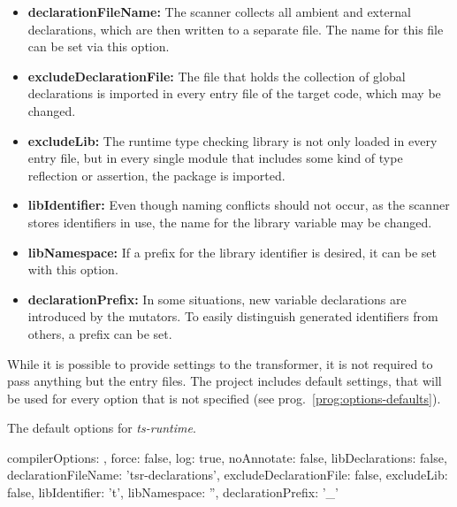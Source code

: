 \begin{itemize}
  \item \textbf{declarationFileName:} The scanner collects all ambient and external declarations, which are then written to a separate file. The name for this file can be set via this option.
  \item \textbf{excludeDeclarationFile:} The file that holds the collection of global declarations is imported in every entry file of the target code, which may be changed.
  \item \textbf{excludeLib:} The runtime type checking library is not only loaded in every entry file, but in every single module that includes some kind of type reflection or assertion, the package is imported.
  \item \textbf{libIdentifier:} Even though naming conflicts should not occur, as the scanner stores identifiers in use, the name for the library variable may be changed.
  \item \textbf{libNamespace:} If a prefix for the library identifier is desired, it can be set with this option.
  \item \textbf{declarationPrefix:} In some situations, new variable declarations are introduced by the mutators. To easily distinguish generated identifiers from others, a prefix can be set.
\end{itemize}
While it is possible to provide settings to the transformer, it is not required to pass anything but the entry files. The project includes default settings, that will be used for every option that is not specified (see prog.~\ref{prog:options-defaults}).
\begin{program}
\caption{The default options for \emph{ts-runtime}.}
\label{prog:options-defaults}
\begin{JsCode}
{
  compilerOptions: {},
  force: false,
  log: true,
  noAnnotate: false,
  libDeclarations: false,
  declarationFileName: 'tsr-declarations',
  excludeDeclarationFile: false,
  excludeLib: false,
  libIdentifier: 't',
  libNamespace: '',
  declarationPrefix: '_'
}
\end{JsCode}
\end{program}

